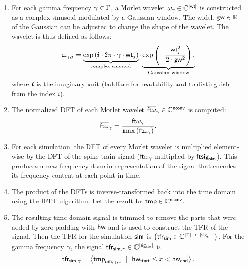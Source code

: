 \begin{enumerate}
    \item For each gamma frequency $\gamma \in \Gamma$, a Morlet wavelet $\omega_\gamma \in \mathbb{C}^{|\mathsf{wt}|}$ is constructed as a complex sinusoid modulated by a Gaussian window. The width $\mathsf{gw} \in \mathbb{R}$ of the Gaussian can be adjusted to change the shape of the wavelet. The wavelet is thus defined as follows:
    \begin{equation}
        \omega_{\gamma, j} = 
        \underbrace{
            \exp \left(
            \pmb{i} \cdot 2 \pi \cdot \gamma \cdot \mathsf{wt}_j
            \right)
        }_{\text{complex sinusoid}}
        \cdot
        \underbrace{
            \exp \left(
                - \frac{
                    \mathsf{wt}_j^2
                }{
                    2 \cdot \mathsf{gw}^2
                }
            \right),
        }_{\text{Gaussian window}}
    \end{equation}
    where $\pmb{i}$ is the imaginary unit (boldface for readability and to distinguish from the index $i$).
    
    \item The normalized DFT of each Morlet wavelet $\overline{\mathsf{ft}\omega}_{\gamma} \in \mathbb{C}^{\mathsf{nconv}}$ is computed:
    \begin{equation}
        \overline{\mathsf{ft}\omega}_{\gamma} = 
        \frac{
            {\mathsf{ft}}{\omega_{\gamma}}
        }{
            \max \left(
                {\mathsf{ft}}{\omega_{\gamma}}
            \right)
        }.
    \end{equation}

    \item For each simulation, the DFT of every Morlet wavelet is multiplied element-wise by the DFT of the spike train signal ($\mathsf{ft}{\omega_{\gamma}}$ multiplied by $\mathsf{ft}\mathsf{sig}_{\mathsf{sim}}$). This produces a new frequency-domain representation of the signal that encodes its frequency content at each point in time.

    \item The product of the DFTs is inverse-transformed back into the time domain using the IFFT algorithm. Let the result be $\mathsf{tmp} \in \mathbb{C}^{\mathsf{nconv}}$.
    
    \item The resulting time-domain signal is trimmed to remove the parts that were added by zero-padding with $\mathsf{hw}$ and is used to construct the TFR of the signal. Then the TFR for the simulation $\mathsf{sim}$ is $\left( \mathsf{tfr}_{\mathsf{sim}} \in \mathbb{C}^{ |\Gamma| \ \times \ |\mathsf{sig}_{\mathsf{sim}}|} \right)$. For the gamma frequency $\gamma$, the signal $\mathsf{tfr}_{\mathsf{sim}, \gamma} \in \mathbb{C}^{|\mathsf{sig}_{\mathsf{sim}}|}$ is
    \begin{equation}
        \tfr_{\tfrsimulation, \onegammafreq} 
        = 
        \left< 
            \tmp_{\tfrsimulation, \onegammafreq, x} 
            \ \mid \ 
            \halfwave_\substart \leq x < \halfwave_\subend
        \right>.
    \end{equation}
    

\end{enumerate}
